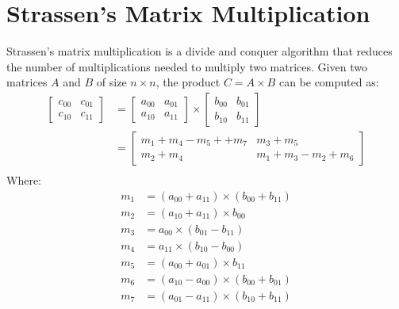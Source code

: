 \documentclass[12pt letter]{report}
\begin{document}
\section{Strassen's Matrix Multiplication}

Strassen's matrix multiplication is a divide and conquer algorithm that reduces the number of multiplications needed to multiply two matrices. Given two matrices $A$ and $B$ of size $n \times n$, the product $C = A \times B$ can be computed as:
\begin{align*}
  \begin{bmatrix} c_{00} & c_{01} \\
                c_{10} & c_{11}
  \end{bmatrix} & = \begin{bmatrix} a_{00} & a_{01} \\ a_{10} & a_{11} \end{bmatrix} \times
  \begin{bmatrix} b_{00} & b_{01} \\ b_{10} & b_{11} \end{bmatrix}                          \\
                                     & = \begin{bmatrix}
                                           m_1 + m_4 - m_5 + + m_7 & m_3 + m_5             \\
                                           m_2 + m_4               & m_1 + m_3 - m_2 + m_6
                                         \end{bmatrix}    \\
\end{align*}
Where:
\begin{align*}
  m_1 & = \left( a_{00} + a_{11} \right) \times \left( b_{00} + b_{11} \right)  \\
  m_2 & = \left( a_{10} + a_{11} \right)\times b_{00}                           \\
  m_3 & = a_{00} \times  \left( b_{01} - b_{11} \right)                         \\
  m_4 & = a_{11} \times \left( b_{10} - b_{00} \right)                          \\
  m_5 & = \left( a_{00} + a_{01} \right) \times b_{11}                          \\
  m_6 & = \left( a_{10} - a_{00} \right) \times  \left( b_{00} + b_{01} \right) \\
  m_7 & = \left( a_{01} - a_{11} \right) \times \left( b_{10} + b_{11} \right)  \\
\end{align*}
\end{document}

